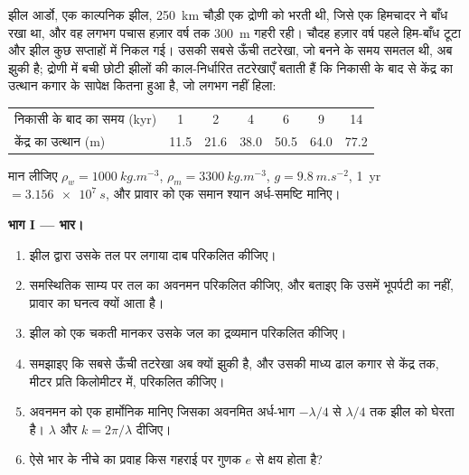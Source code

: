 \begin{problem}
\label{pb:b3:mantle-convection:1}
झील आर्डो, एक काल्पनिक झील, \qty{250}{km} चौड़ी एक द्रोणी को भरती थी, जिसे
एक हिमचादर ने बाँध रखा था, और वह लगभग पचास हज़ार वर्ष तक \qty{300}{m} गहरी रही। चौदह
हज़ार वर्ष पहले हिम-बाँध टूटा और झील कुछ सप्ताहों में निकल गई। उसकी
सबसे ऊँची तटरेखा, जो बनने के समय समतल थी, अब झुकी है; द्रोणी में बची छोटी झीलों की
काल-निर्धारित तटरेखाएँ बताती हैं कि निकासी के बाद से केंद्र का उत्थान
कगार के सापेक्ष कितना हुआ है, जो लगभग नहीं हिला:

\smallskip
\begin{center}\small
\begin{tabular}{lcccccc}
\hline
निकासी के बाद का समय (kyr) & 1 & 2 & 4 & 6 & 9 & 14\\
केंद्र का उत्थान (m) & 11.5 & 21.6 & 38.0 & 50.5 & 64.0 & 77.2\\
\hline
\end{tabular}
\end{center}
\smallskip

मान लीजिए $\rho_w = \qty{1000}{kg.m^{-3}}$, $\rho_m = \qty{3300}{kg.m^{-3}}$, $g =
\qty{9.8}{m.s^{-2}}$, \qty{1}{yr} $= \qty{3.156e7}{s}$, और प्रावार को
एक समान श्यान अर्ध-समष्टि मानिए।

\medskip\noindent\textbf{भाग I --- भार।}
\begin{enumerate}
  \item झील द्वारा उसके तल पर लगाया दाब परिकलित कीजिए।
  \item समस्थितिक साम्य पर तल का अवनमन परिकलित कीजिए, और बताइए
        कि उसमें भूपर्पटी का नहीं, प्रावार का घनत्व क्यों आता है।
  \item झील को एक चकती मानकर उसके जल का द्रव्यमान परिकलित कीजिए।
  \item समझाइए कि सबसे ऊँची तटरेखा अब क्यों झुकी है, और उसकी माध्य
        ढाल कगार से केंद्र तक, मीटर प्रति किलोमीटर में, परिकलित कीजिए।
  \item अवनमन को एक हार्मोनिक मानिए जिसका अवनमित अर्ध-भाग
        $-\lambda/4$ से $\lambda/4$ तक झील को घेरता है। $\lambda$ और $k =
        2\pi/\lambda$ दीजिए।
  \item ऐसे भार के नीचे का प्रवाह किस गहराई पर गुणक
        $e$ से क्षय होता है?
\end{enumerate}


\end{problem}
